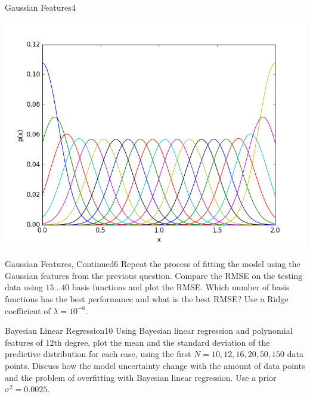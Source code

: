 \begin{questions}
\begin{question}{Gaussian Features}{4}
\begin{answer}
\centering \includegraphics[width=1.0\linewidth]{img/31b}\label{fig:gaussians}



\end{answer}

\end{question}


\begin{question}{Gaussian Features, Continued}{6}
Repeat the process of fitting the model using the Gaussian features from the previous question. Compare the RMSE on the testing data using $15 \ldots 40$ basis functions and plot the RMSE. Which number of basis functions has the best performance and what is the best RMSE? Use a Ridge coefficient of $\lambda=10^{-6}$.

\begin{answer}\end{answer}

\end{question}


\begin{question}{Bayesian Linear Regression}{10}
Using Bayesian linear regression and polynomial features of 12th degree, plot the mean and the standard deviation of the predictive distribution for each case, using the first $N={10, 12, 16, 20, 50, 150}$ data points.
Discuss how the model uncertainty change with the amount of data points and the problem of overfitting with Bayesian linear regression. Use a prior $\sigma^2=0.0025$.


\end{question}
\end{questions}
